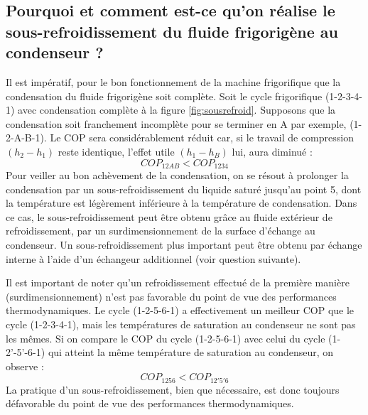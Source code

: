 \subsection{Pourquoi et comment est-ce qu'on réalise le sous-refroidissement du fluide frigorigène au condenseur ?}
Il est impératif, pour le bon fonctionnement de la machine frigorifique que la condensation du fluide frigorigène soit complète. Soit le cycle frigorifique (1-2-3-4-1) avec condensation complète à la figure \ref{fig:sousrefroid}. Supposons que la condensation soit franchement incomplète pour se terminer en A par exemple, (1-2-A-B-1). Le COP sera considérablement réduit car, si le travail de compression $(h_2-h_1)$ reste identique, l'effet utile $(h_1-h_B)$ lui, aura diminué :
\begin{equation} COP_{12AB} < COP_{1234} \end{equation}
Pour veiller au bon achèvement de la condensation, on se résout à prolonger la condensation par un sous-refroidissement du liquide saturé jusqu'au point 5, dont la température est légèrement inférieure à la température de condensation. Dans ce cas, le sous-refroidissement peut être obtenu grâce au fluide extérieur de refroidissement, par un surdimensionnement de la surface d'échange au condenseur. Un sous-refroidissement plus important peut être obtenu par échange interne à l'aide d'un échangeur additionnel (voir question suivante). 

Il est important de noter qu'un refroidissement effectué de la première manière (surdimensionnement) n'est pas favorable du point de vue des performances thermodynamiques. Le cycle (1-2-5-6-1) a effectivement un meilleur COP que le cycle (1-2-3-4-1), mais les températures de saturation au condenseur ne sont pas les mêmes. Si on compare le COP du cycle (1-2-5-6-1) avec celui du cycle (1-2'-5'-6-1) qui atteint la même température de saturation au condenseur, on observe :
\begin{equation} COP_{1256} < COP_{12'5'6} \end{equation}  
La pratique d'un sous-refroidissement, bien que nécessaire, est donc toujours défavorable du point de vue des performances thermodynamiques.

